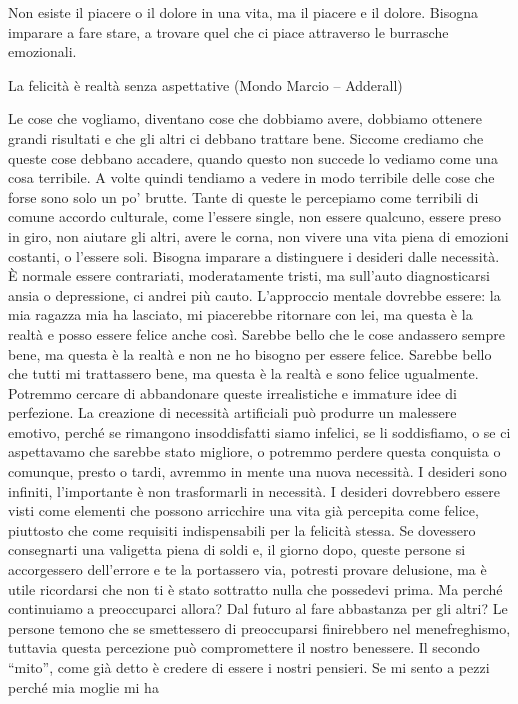 \documentclass[12pt]{book} %
\begin{document}
Non esiste il piacere o il dolore in una vita, ma il piacere e il dolore. Bisogna imparare a fare stare, a trovare quel
che ci piace attraverso le burrasche emozionali.

La felicità è realtà senza aspettative (Mondo Marcio – Adderall)

Le cose che vogliamo, diventano cose che dobbiamo avere, dobbiamo ottenere grandi risultati e che gli altri ci debbano
trattare bene. Siccome crediamo che queste cose debbano accadere, quando questo non succede lo vediamo come una cosa
terribile. A volte quindi tendiamo a vedere in modo terribile delle cose che forse sono solo un po'
brutte. Tante di queste le percepiamo come terribili di comune accordo culturale, come l'essere
single, non essere qualcuno, essere preso in giro, non aiutare gli altri, avere le corna, non vivere una vita piena di
emozioni costanti, o l'essere soli. Bisogna imparare a distinguere i desideri dalle necessità. È
normale essere contrariati, moderatamente tristi, ma sull'auto diagnosticarsi ansia o depressione, ci andrei più cauto. L'approccio mentale dovrebbe
essere: la mia ragazza mia ha lasciato, mi piacerebbe ritornare con lei, ma questa è la realtà e posso essere felice
anche così. Sarebbe bello che le cose andassero sempre bene, ma questa è la realtà e non ne ho bisogno per essere
felice. Sarebbe bello che tutti mi trattassero bene, ma questa è la realtà e sono felice ugualmente. Potremmo cercare di
abbandonare queste irrealistiche e immature idee di perfezione. La creazione di necessità artificiali può produrre un
malessere emotivo, perché se rimangono insoddisfatti siamo infelici, se li soddisfiamo, o se ci aspettavamo che sarebbe
stato migliore, o potremmo perdere questa conquista o comunque, presto o tardi, avremmo in mente una nuova necessità. I
desideri sono infiniti, l'importante è non trasformarli in necessità. I desideri dovrebbero essere visti come elementi che possono arricchire una vita già percepita come felice, piuttosto che come requisiti indispensabili per la felicità stessa. Se
dovessero consegnarti una valigetta piena di soldi e, il giorno dopo, queste persone si accorgessero dell'errore e
te la portassero via, potresti provare delusione, ma è utile ricordarsi che non ti è stato sottratto nulla che possedevi prima. Ma perché
continuiamo a preoccuparci allora? Dal futuro al fare abbastanza per gli altri? Le persone temono che se smettessero di
preoccuparsi finirebbero nel menefreghismo, tuttavia questa percezione può compromettere il nostro benessere. Il
secondo “mito”, come già detto è credere di essere i nostri pensieri. Se mi sento a pezzi perché mia moglie mi ha
\end{document}
